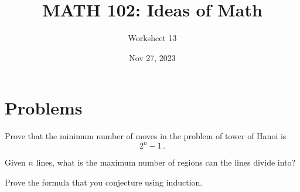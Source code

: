 \documentclass[12pt]{amsart}
\title{ MATH 102: Ideas  of Math }
\author{ Worksheet 13 }
\date{Nov 27, 2023}
\begin{document}
\maketitle

\section{ Problems }
\begin{problem}
    Prove that the minimum number of moves in the problem of tower of
    Hanoi is 
    \begin{equation*}
        2^n - 1 \,.
    \end{equation*}
\end{problem}

\begin{problem}
  Given $n$ lines, what is the maximum number of regions can the lines divide into? 
  
  Prove the formula that you conjecture using induction.
\end{problem}
\end{document}
